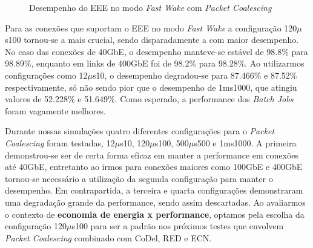 \begin{figure}[!htb]
    \centering
    \label{fig:PerfEEEFastWakePaCo}
    
    \hfill
    
    \caption{\centering Desempenho do EEE no modo \emph{Fast Wake} com \emph{Packet Coalescing}}
\end{figure}

Para as conexões que suportam o EEE no modo \emph{Fast Wake} a configuração 120$\mu$s100 tornou-se a mais crucial, sendo disparadamente a com maior desempenho. No caso das conexões de 40GbE, o desempenho manteve-se estável de 98.8\% para 98.89\%, enquanto em links de 400GbE foi de 98.2\% para 98.28\%. Ao utilizarmos configurações como 12$\mu$s10, o desempenho degradou-se para 87.466\% e 87.52\% respectivamente, só não sendo pior que o desempenho de 1ms1000, que atingiu valores de 52.228\% e 51.649\%. Como esperado, a performance dos \emph{Batch Jobs} foram vagamente melhores.

Durante nossas simulações quatro diferentes configurações para o \emph{Packet Coalescing} foram testadas, 12$\mu$s10, 120$\mu$s100, 500$\mu$s500 e 1ms1000. A primeira demonstrou-se ser de certa forma eficaz em manter a performance em conexões até 40GbE, entretanto ao irmos para conexões maiores como 100GbE e 400GbE tornou-se necessário a utilização da segunda configuração para manter o desempenho. Em contrapartida, a terceira e quarta configurações demonstraram uma degradação grande da performance, sendo assim descartadas. Ao avaliarmos o contexto de \textbf{economia de energia x performance}, optamos pela escolha da configuração 120$\mu$s100 para ser a padrão nos próximos testes que envolvem \emph{Packet Coalescing} combinado com CoDel, RED e ECN.

